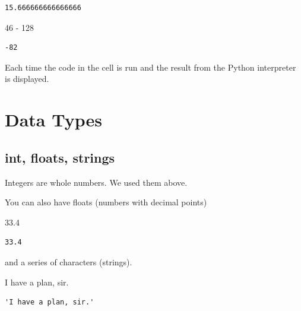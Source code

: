 \documentclass[
  letterpaper,
  DIV=11,
  numbers=noendperiod]{scrreprt}
\newenvironment{Shaded}{\begin{snugshade}}{\end{snugshade}}
\newcommand{\CommentTok}[1]{\textcolor[rgb]{0.37,0.37,0.37}{#1}}
\newcommand{\DecValTok}[1]{\textcolor[rgb]{0.68,0.00,0.00}{#1}}
\newcommand{\FloatTok}[1]{\textcolor[rgb]{0.68,0.00,0.00}{#1}}
\newcommand{\OperatorTok}[1]{\textcolor[rgb]{0.37,0.37,0.37}{#1}}
\begin{document}
\begin{verbatim}
15.666666666666666
\end{verbatim}

\begin{Shaded}
\begin{Highlighting}[]
\DecValTok{46} \OperatorTok{{-}} \DecValTok{128}
\end{Highlighting}
\end{Shaded}

\begin{verbatim}
-82
\end{verbatim}

Each time the code in the cell is run and the result from the Python
interpreter is displayed.


\hypertarget{data-types}{%
\chapter{Data Types}\label{data-types}}

\hypertarget{int-floats-strings}{%
\section{int, floats, strings}\label{int-floats-strings}}

Integers are whole numbers. We used them above.

You can also have floats (numbers with decimal points)

\begin{Shaded}
\begin{Highlighting}[]
\FloatTok{33.4}
\end{Highlighting}
\end{Shaded}

\begin{verbatim}
33.4
\end{verbatim}

and a series of characters (strings).

\begin{Shaded}
\begin{Highlighting}[]
\CommentTok{\textquotesingle{}I have a plan, sir.\textquotesingle{}}
\end{Highlighting}
\end{Shaded}

\begin{verbatim}
'I have a plan, sir.'
\end{verbatim}
\end{document}
